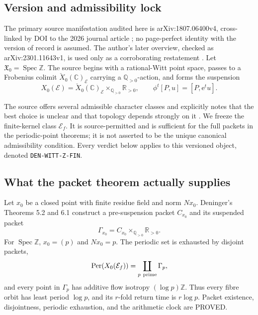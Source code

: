 \documentclass[11pt]{article}
\theoremstyle{definition}
\theoremstyle{remark}
\newcommand{\R}{\mathbb{R}}
\newcommand{\Q}{\mathbb{Q}}
\newcommand{\Z}{\mathbb{Z}}
\newcommand{\Spec}{\operatorname{Spec}}
\newcommand{\Per}{\operatorname{Per}}
\newcommand{\e}{\mathrm{e}}
\newcommand{\proved}{\textsf{PROVED}}
\begin{document}
\subsection{Version and admissibility lock}

The primary source manifestation audited here is arXiv:1807.06400v4,
cross-linked by DOI to the 2026 journal article \citep{Deninger2026}; no
page-perfect identity with the version of record is assumed.  The author's
later overview, checked as arXiv:2301.11643v1, is used only as a corroborating
restatement \citep{Deninger2024}.  Let
\(\mathfrak X_0=\Spec\Z\).  The source begins with a rational-Witt point
space, passes to a Frobenius colimit
\(\check X_0(\mathbb C)_{\mathcal E}\) carrying a
\(\Q_{>0}\)-action, and forms the suspension
\begin{equation}
 X_0(\mathcal E)=
 \check X_0(\mathbb C)_{\mathcal E}
 \times_{\Q_{>0}}\R_{>0},
 \qquad
 \phi^t[P,u]=[P,\e^t u].
 \label{eq:suspension}
\end{equation}

The source offers several admissible character classes and explicitly notes
that the best choice is unclear and that topology depends strongly on it
\citep{Deninger2026}.  We freeze the finite-kernel class
\(\mathcal E_f\).  It is source-permitted and is sufficient for the full
packets in the periodic-point theorems; it is not asserted to be the unique
canonical admissibility condition.  Every verdict below applies to this
versioned object, denoted \texttt{DEN-WITT-Z-FIN}.

\subsection{What the packet theorem actually supplies}

Let \(x_0\) be a closed point with finite residue field and norm
\(N x_0\).  Deninger's Theorems 5.2 and 6.1 construct a pre-suspension packet
\(C_{x_0}\) and its suspended packet
\[
 \Gamma_{x_0}
   =C_{x_0}\times_{\Q_{>0}}\R_{>0}.
\]
For \(\Spec\Z\), \(x_0=(p)\) and \(N x_0=p\).  The periodic set is exhausted
by disjoint packets,
\begin{equation}
 \Per(X_0(\mathcal E_f))
   =\coprod_{p\ {\rm prime}}\Gamma_p,
 \label{eq:packetdecomp}
\end{equation}
and every point in \(\Gamma_p\) has additive flow isotropy
\((\log p)\Z\).  Thus every fibre orbit has least period \(\log p\), and its
\(r\)-fold return time is \(r\log p\).  Packet existence, disjointness,
periodic exhaustion, and the arithmetic clock are \proved.
\end{document}
